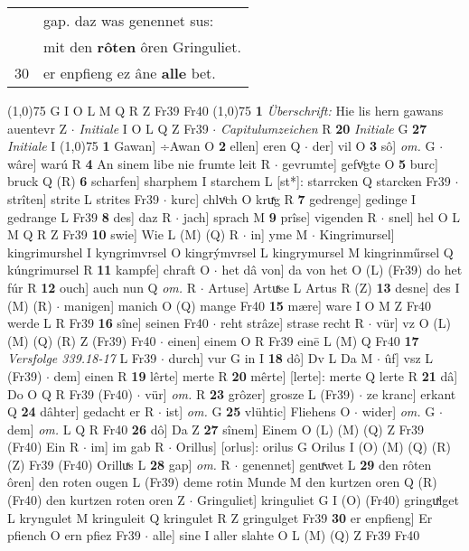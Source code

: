 \documentclass[8pt,a4paper,notitlepage]{article}
\begin{document}
\begin{table}[ht]
\begin{minipage}[t]{0.5\linewidth}
\begin{tabular}{rl}
 & gap. daz was genennet sus:\\ 
 & mit den \textbf{rôten} ôren Gringuliet.\\ 
30 & er enpfieng ez âne \textbf{alle} bet.\\ 
\end{tabular}
\scriptsize
\line(1,0){75} \newline
G I O L M Q R Z Fr39 Fr40 \newline
\line(1,0){75} \newline
\textbf{1} \textit{Überschrift:} Hie lis hern gawans auentevr Z   $\cdot$ \textit{Initiale} I O L Q Z Fr39   $\cdot$ \textit{Capitulumzeichen} R  \textbf{20} \textit{Initiale} G  \textbf{27} \textit{Initiale} I  \newline
\line(1,0){75} \newline
\textbf{1} Gawan] ÷Awan O \textbf{2} ellen] eren Q  $\cdot$ der] vil O \textbf{3} sô] \textit{om.} G  $\cdot$ wâre] warú R \textbf{4} An sinem libe nie frumte leit R  $\cdot$ gevrumte] gefvͦgte O \textbf{5} burc] bruck Q (R) \textbf{6} scharfen] sharphem I starchem L [st*]: starrcken Q starcken Fr39  $\cdot$ strîten] strite L strites Fr39  $\cdot$ kurc] chlvͦch O kruͯg R \textbf{7} gedrenge] gedinge I gedrange L Fr39 \textbf{8} des] daz R  $\cdot$ jach] sprach M \textbf{9} prîse] vigenden R  $\cdot$ snel] hel O L M Q R Z Fr39 \textbf{10} swie] Wie L (M) (Q) R  $\cdot$ in] yme M  $\cdot$ Kingrimursel] kingrimurshel I kyngrimvrsel O kingrýmvrsel L kingrymursel M kingrinműrsel Q kúngrimursel R \textbf{11} kampfe] chraft O  $\cdot$ het dâ von] da von het O (L) (Fr39) do het fúr R \textbf{12} ouch] auch nun Q \textit{om.} R  $\cdot$ Artuse] Artuͯse L Artus R (Z) \textbf{13} desne] des I (M) (R)  $\cdot$ manigen] manich O (Q) mange Fr40 \textbf{15} mære] ware I O M Z Fr40 werde L R Fr39 \textbf{16} sîne] seinen Fr40  $\cdot$ reht strâze] strase recht R  $\cdot$ vür] vz O (L) (M) (Q) (R) Z (Fr39) Fr40  $\cdot$ einen] einem O R Fr39 einē L (M) Q Fr40 \textbf{17} \textit{Versfolge 339.18-17} L Fr39   $\cdot$ durch] vur G in I \textbf{18} dô] Dv L Da M  $\cdot$ ûf] vsz L (Fr39)  $\cdot$ dem] einen R \textbf{19} lêrte] merte R \textbf{20} mêrte] [lerte]: merte Q lerte R \textbf{21} dâ] Do O Q R Fr39 (Fr40)  $\cdot$ vür] \textit{om.} R \textbf{23} grôzer] grosze L (Fr39)  $\cdot$ ze kranc] erkant Q \textbf{24} dâhter] gedacht er R  $\cdot$ ist] \textit{om.} G \textbf{25} vlühtic] Fliehens O  $\cdot$ wider] \textit{om.} G  $\cdot$ dem] \textit{om.} L Q R Fr40 \textbf{26} dô] Da Z \textbf{27} sînem] Einem O (L) (M) (Q) Z Fr39 (Fr40) Ein R  $\cdot$ im] im gab R  $\cdot$ Orillus] [orlus]: orilus G Orilus I (O) (M) (Q) (R) (Z) Fr39 (Fr40) Orilluͯs L \textbf{28} gap] \textit{om.} R  $\cdot$ genennet] genuͯwet L \textbf{29} den rôten ôren] den roten ougen L (Fr39) deme rotin Munde M den kurtzen oren Q (R) (Fr40) den kurtzen roten oren Z  $\cdot$ Gringuliet] kringuliet G I (O) (Fr40) gringuͯlget L kryngulet M kringuleit Q kringulet R Z gringulget Fr39 \textbf{30} er enpfieng] Er pfiench O ern pfiez Fr39  $\cdot$ alle] sine I aller slahte O L (M) (Q) Z Fr39 Fr40 \newline

\end{minipage}
\end{table}
\end{document}

